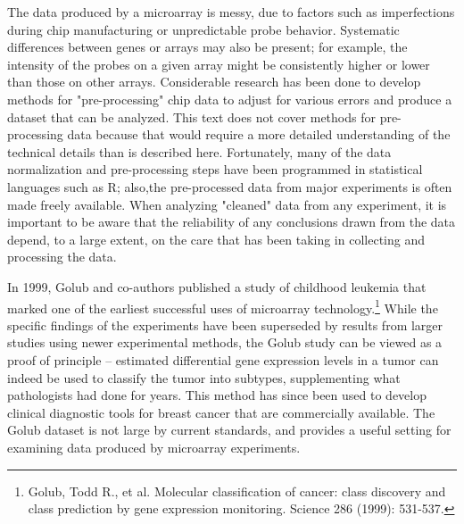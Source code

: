 The data produced by a microarray is messy, due to factors such as imperfections during chip manufacturing or unpredictable probe behavior. Systematic differences between genes or arrays may also be present; for example, the intensity of the probes on a given array might be consistently higher or lower than those on other arrays. Considerable research has been done to develop methods for "pre-processing" chip data to adjust for various errors and produce a dataset that can be analyzed. This text does not cover methods for pre-processing data because that would require a more detailed understanding of the technical details than is described here. Fortunately, many of the data normalization and pre-processing steps have been programmed in statistical languages such as \textsf{R}; also,the pre-processed data from major experiments is often made freely available. When analyzing "cleaned" data from any experiment, it is important to be aware that the reliability of any conclusions drawn from the data depend, to a large extent, on the care that has been taking in collecting and processing the data.

In 1999, Golub and co-authors published a study of childhood leukemia that marked one of the earliest successful uses of microarray technology.\footnote{Golub, Todd R., et al. Molecular classification of cancer: class discovery and class prediction by gene expression monitoring. Science 286 (1999): 531-537.} While the specific findings of the experiments have been superseded by results from larger studies using newer experimental methods, the Golub study can be viewed as a proof of principle -- estimated differential gene expression levels in a tumor can indeed be used to classify the tumor into subtypes, supplementing what pathologists had done for years. This method has since been used to develop clinical diagnostic tools for breast cancer that are commercially available. The Golub dataset is not large by current standards, and provides a useful setting for examining data produced by microarray experiments.


